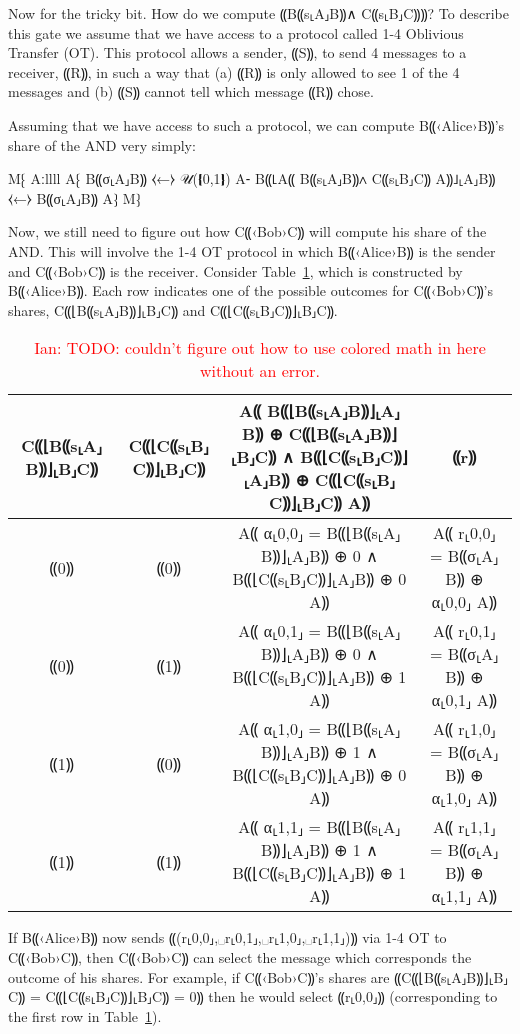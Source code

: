 \documentclass{report}
\newcommand{\ins}[1]{\textcolor{red}{Ian: #1}}
\newcommand{\alice}{B⸨‹Alice›B⸩\xspace}
\newcommand{\bob}{C⸨‹Bob›C⸩\xspace}
\newcommand{\alices}[1]{B⸨#1⸤A⸥B⸩}
\newcommand{\bobs}[1]{C⸨#1⸤B⸥C⸩}
\newcommand{\aliceSec}{\alices{s}\xspace}
\newcommand{\bobSec}{\bobs{s}\xspace}
\newcommand{\aliceSh}[1]{\alices{⌊#1⌋}}
\newcommand{\bobSh}[1]{\bobs{⌊#1⌋}}
\begin{document}
Now for the tricky bit. How do we compute ⸨\aliceSec ∧ \bobSec⸩? To describe this gate we assume that we have access to a
protocol called 1-4 Oblivious Transfer (OT). This protocol allows a sender, ⸨S⸩, to send 4 messages to a receiver, ⸨R⸩, in such a
way that (a) ⸨R⸩ is only allowed to see 1 of the 4 messages and (b) ⸨S⸩ cannot tell which message ⸨R⸩ chose.

Assuming that we have access to such a protocol, we can compute \alice's share of the AND very simply:

M⁅
  Aːllll
  A⁅ \alices{σ}                          ⧼←⧽ 𝒰(❴0,1❵)
  A⁃ \aliceSh{A⸨ \aliceSec ∧ \bobSec A⸩} ⧼←⧽ \alices{σ}
  A⁆
M⁆

Now, we still need to figure out how \bob will compute his share of the AND. This will involve the 1-4 OT protocol in which \alice is the
sender and \bob is the receiver. Consider Table~\ref{tab:and-ot}, which is constructed by \alice. Each row indicates one of the possible
outcomes for \bob's shares, \bobSh{\aliceSec} and \bobSh{\bobSec}.

\begin{table}[h]
  \centering
  \begin{tabular}{|c|c|c|c|}
    \hline
    \bobSh{\aliceSec} & \bobSh{\bobSec} & A⸨ \aliceSh{\aliceSec} ⊕ \bobSh{\aliceSec} ∧ \aliceSh{\bobSec} ⊕ \bobSh{\bobSec} A⸩ & ⸨r⸩ \\ \hline
    ⸨0⸩ & ⸨0⸩ & A⸨ α⸤0,0⸥ = \aliceSh{\aliceSec} ⊕ 0 ∧ \aliceSh{\bobSec} ⊕ 0 A⸩ & A⸨ r⸤0,0⸥ = \alices{σ} ⊕ α⸤0,0⸥ A⸩ \\ \hline
    ⸨0⸩ & ⸨1⸩ & A⸨ α⸤0,1⸥ = \aliceSh{\aliceSec} ⊕ 0 ∧ \aliceSh{\bobSec} ⊕ 1 A⸩ & A⸨ r⸤0,1⸥ = \alices{σ} ⊕ α⸤0,1⸥ A⸩ \\ \hline
    ⸨1⸩ & ⸨0⸩ & A⸨ α⸤1,0⸥ = \aliceSh{\aliceSec} ⊕ 1 ∧ \aliceSh{\bobSec} ⊕ 0 A⸩ & A⸨ r⸤1,0⸥ = \alices{σ} ⊕ α⸤1,0⸥ A⸩ \\ \hline
    ⸨1⸩ & ⸨1⸩ & A⸨ α⸤1,1⸥ = \aliceSh{\aliceSec} ⊕ 1 ∧ \aliceSh{\bobSec} ⊕ 1 A⸩ & A⸨ r⸤1,1⸥ = \alices{σ} ⊕ α⸤1,1⸥ A⸩ \\ \hline
  \end{tabular}
  \caption{\ins{TODO: couldn't figure out how to use colored math in here without an error.}}
  \label{tab:and-ot}
\end{table}

If \alice now sends ⸨(r⸤0,0⸥,␣r⸤0,1⸥,␣r⸤1,0⸥,␣r⸤1,1⸥)⸩ via 1-4 OT to \bob, then \bob can select the message which corresponds the outcome
of his shares. For example, if \bob's shares are ⸨\bobSh{\aliceSec} = \bobSh{\bobSec} = 0⸩ then he would select ⸨r⸤0,0⸥⸩ (corresponding
to the first row in Table~\ref{tab:and-ot}).
\end{document}
